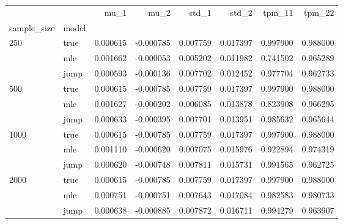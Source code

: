 \begin{tabular}{llrrrrrr}
\toprule
     &      &      mu\_1 &      mu\_2 &     std\_1 &     std\_2 &    tpm\_11 &    tpm\_22 \\
sample\_size & model &           &           &           &           &           &           \\
\midrule
250  & true &  0.000615 & -0.000785 &  0.007759 &  0.017397 &  0.997900 &  0.988000 \\
     & mle &  0.001662 & -0.000053 &  0.005202 &  0.011982 &  0.741502 &  0.965289 \\
     & jump &  0.000593 & -0.000136 &  0.007702 &  0.012452 &  0.977704 &  0.962733 \\
500  & true &  0.000615 & -0.000785 &  0.007759 &  0.017397 &  0.997900 &  0.988000 \\
     & mle &  0.001627 & -0.000202 &  0.006085 &  0.013878 &  0.823908 &  0.966295 \\
     & jump &  0.000633 & -0.000395 &  0.007701 &  0.013951 &  0.985632 &  0.965644 \\
1000 & true &  0.000615 & -0.000785 &  0.007759 &  0.017397 &  0.997900 &  0.988000 \\
     & mle &  0.001110 & -0.000620 &  0.007075 &  0.015976 &  0.922894 &  0.974319 \\
     & jump &  0.000620 & -0.000748 &  0.007811 &  0.015731 &  0.991565 &  0.962725 \\
2000 & true &  0.000615 & -0.000785 &  0.007759 &  0.017397 &  0.997900 &  0.988000 \\
     & mle &  0.000751 & -0.000751 &  0.007643 &  0.017084 &  0.982583 &  0.980733 \\
     & jump &  0.000638 & -0.000885 &  0.007872 &  0.016711 &  0.994279 &  0.963907 \\
\bottomrule
\end{tabular}
